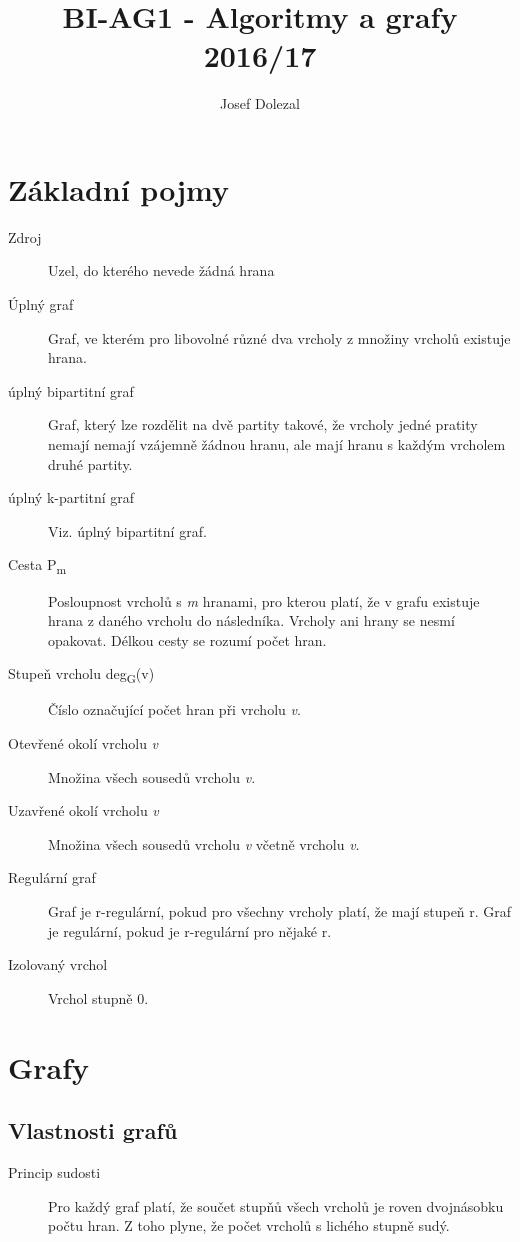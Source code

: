 \documentclass{article}
\title{BI-AG1 - Algoritmy a grafy 2016/17}
\author{Josef Dolezal}
\begin{document}
\tableofcontents

\section{Základní pojmy}

  \begin{description}
    \item[Zdroj] Uzel, do kterého nevede žádná hrana
    \item[Úplný graf] Graf, ve kterém pro libovolné různé dva vrcholy z množiny vrcholů existuje hrana.
    \item[úplný bipartitní graf] Graf, který lze rozdělit na dvě partity takové, že vrcholy jedné pratity nemají nemají vzájemně žádnou hranu, ale mají hranu s každým vrcholem druhé partity.
    \item[úplný k-partitní graf] Viz. úplný bipartitní graf.
    \item[Cesta P\textsubscript{m}] Posloupnost vrcholů s \emph{m} hranami, pro kterou platí, že v grafu existuje hrana z daného vrcholu do následníka. Vrcholy ani hrany se nesmí opakovat. Délkou cesty se rozumí počet hran.
    \item[Stupeň vrcholu deg\textsubscript{G}(v)] Číslo označující počet hran při vrcholu \emph{v}.
    \item[Otevřené okolí vrcholu \emph{v}] Množina všech sousedů vrcholu \emph{v}.
    \item[Uzavřené okolí vrcholu \emph{v}] Množina všech sousedů vrcholu \emph{v} včetně vrcholu \emph{v}.
    \item[Regulární graf] Graf je r-regulární, pokud pro všechny vrcholy platí, že mají stupeň r. Graf je regulární, pokud je r-regulární pro nějaké r.
    \item[Izolovaný vrchol] Vrchol stupně 0.
  \end{description}

\newpage

\section{Grafy}

  \subsection{Vlastnosti grafů}
    \begin{description}
       \item[Princip sudosti] Pro každý graf platí, že součet stupňů všech vrcholů je roven dvojnásobku počtu hran. Z toho plyne, že počet vrcholů s lichého stupně sudý.
    \end{description}
\end{document}
